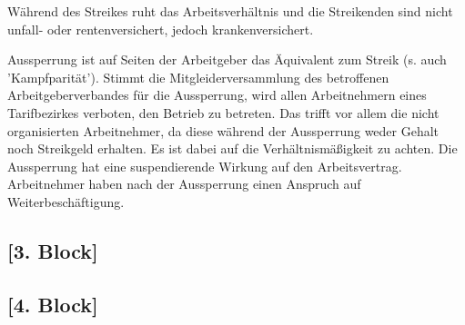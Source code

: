 Während des Streikes ruht das Arbeitsverhältnis und die Streikenden sind nicht unfall- oder rentenversichert, jedoch krankenversichert.

Aussperrung ist auf Seiten der Arbeitgeber das Äquivalent zum Streik (s. auch 'Kampfparität'). Stimmt die Mitgleiderversammlung des betroffenen Arbeitgeberverbandes für die Aussperrung, wird allen Arbeitnehmern eines Tarifbezirkes verboten, den Betrieb zu betreten. Das trifft vor allem die nicht organisierten Arbeitnehmer, da diese während der Aussperrung weder Gehalt noch Streikgeld erhalten. Es ist dabei auf die Verhältnismäßigkeit zu achten. Die  Aussperrung hat eine suspendierende Wirkung auf den Arbeitsvertrag. Arbeitnehmer haben nach der Aussperrung einen Anspruch auf Weiterbeschäftigung.

\subsection{[3. Block]}
\subsection{[4. Block]}